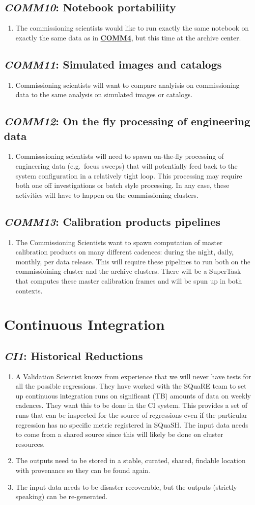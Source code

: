 \documentclass[DM,toc,lsstdraft]{lsstdoc}
\newcommand{\usecase}[3]{%
\subsection{\emph{#1}: #2}
\label{use:#1}
\begin{enumerate}[label=\alph*.]
#3
\end{enumerate}
}
\newcommand{\useref}[1]{\hyperref[use:#1]{\textcolor{lsstblue}{\textbf{#1}}}}
\begin{document}
\usecase{COMM10}{Notebook portabiliity}{%

\item
The commissioning scientists would like to run exactly the same notebook on exactly the same data as in \useref{COMM4}, but this time at the archive center.

}

\usecase{COMM11}{Simulated images and catalogs}{%

\item
Commissioning scientists will want to compare analyisis on commissioning data to the same analysis on simulated images or catalogs.

}

\usecase{COMM12}{On the fly processing of engineering data}{%

\item
Commisssioning scientists will need to spawn on-the-fly processing of engineering data (e.g.\ focus sweeps) that will potentially feed back to the system configuration in a relatively tight loop.
This processing may require both one off investigations or batch style processing.
In any case, these activities will have to happen on the commissioning clusters.

}

\usecase{COMM13}{Calibration products pipelines}{%

\item
The Commissioning Scientists want to spawn computation of master calibration products on many different cadences: during the night, daily, monthly, per data release.
This will require these pipelines to run both on the commissioining cluster and the archive clusters.
There will be a SuperTask that computes these master calibration frames and will be spun up in both contexts.

}

\section{Continuous Integration}

\usecase{CI1}{Historical Reductions}{%

\item
A Validation Scientist knows from experience that we will never have tests for all the possible regressions.
They have worked with the SQuaRE team to set up continuous integration runs on significant (TB) amounts of data on weekly cadences.
They want this to be done in the CI system.
This provides a set of runs that can be inspected for the source of regressions even if the particular regression has no specific metric registered in SQuaSH.
The input data needs to come from a shared source since this will likely be done on cluster resources.

\item
The outputs need to be stored in a stable, curated, shared, findable location with provenance so they can be found again.

\item
The input data needs to be disaster recoverable, but the outputs (strictly speaking) can be re-generated.

}
\end{document}
